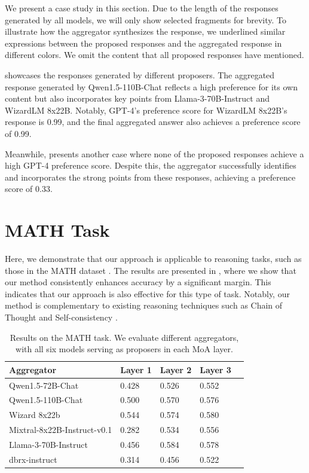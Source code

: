 We present a case study in this section. 
Due to the length of the responses generated by all models, we will only show selected fragments for brevity. 
To illustrate how the aggregator synthesizes the response, 
we underlined similar expressions between the proposed responses and the aggregated response in different colors.
We omit the content that all proposed responses have mentioned.

 showcases the responses generated by different proposers.
The aggregated response generated by Qwen1.5-110B-Chat 
reflects a high preference for its own content but also incorporates key points 
from Llama-3-70B-Instruct and WizardLM 8x22B. 
Notably, GPT-4's preference score for WizardLM 8x22B's response is 0.99, 
and the final aggregated answer also achieves a preference score of 0.99.

Meanwhile,  presents another case
where none of the proposed responses achieve a high GPT-4 preference score. 
Despite this, the aggregator successfully identifies and 
incorporates the strong points from these responses,
achieving a preference score of 0.33.


\section{MATH Task}

Here, we demonstrate that our approach is applicable to reasoning tasks, 
such as those in the MATH dataset \cite{hendrycks2021measuring}.
The results are presented in , where we show that our method consistently enhances accuracy by a significant margin. 
This indicates that our approach is also effective for this type of task.
Notably, our method is complementary to existing reasoning techniques such as Chain of Thought \cite{cot} and Self-consistency \cite{cot-sc}.

\begin{table}[t]
\centering
\caption{
Results on the MATH task. 
We evaluate different aggregators,
with all six models serving as proposers in each MoA layer.
}
\begin{tabular}{@{}lllll@{}}
\toprule
Aggregator                  & Layer 1 & Layer 2 & Layer 3  \\
\midrule
Qwen1.5-72B-Chat            & 0.428              & 0.526   & 0.552    \\
Qwen1.5-110B-Chat           & 0.500              & 0.570   & 0.576    \\
Wizard 8x22b                & 0.544              & 0.574   & 0.580    \\
Mixtral-8x22B-Instruct-v0.1 & 0.282              & 0.534   & 0.556    \\
Llama-3-70B-Instruct        & 0.456              & 0.584   & 0.578    \\
dbrx-instruct               & 0.314              & 0.456   & 0.522    \\
\bottomrule
\end{tabular}
\label{tab:MATH}
\end{table}

